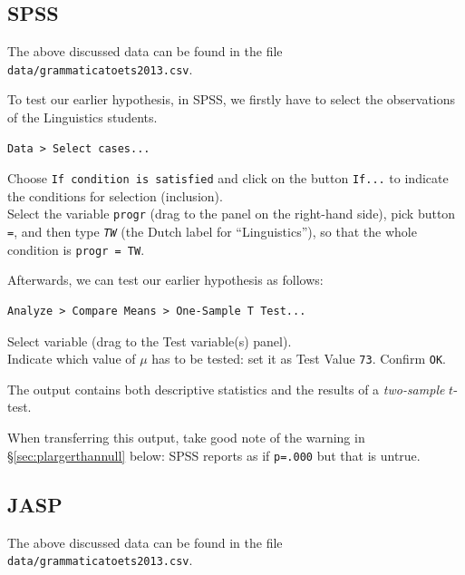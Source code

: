 \documentclass[
]{book}
\begin{document}
\subsection{SPSS}\label{spss-10}

The above discussed data can be found in the file \texttt{data/grammaticatoets2013.csv}.

To test our earlier hypothesis, in SPSS, we firstly have
to select the observations of the Linguistics students.

\begin{verbatim}
Data > Select cases...
\end{verbatim}

Choose \texttt{If\ condition\ is\ satisfied} and click on the button \texttt{If...} to indicate
the conditions for selection (inclusion).~\\
Select the variable \texttt{progr} (drag to the panel on the right-hand side), pick
button \texttt{=}, and then type \emph{\texttt{TW}} (the Dutch label for ``Linguistics''), so that the whole condition is
\texttt{progr\ =\ TW}.

Afterwards, we can test our earlier hypothesis as follows:

\begin{verbatim}
Analyze > Compare Means > One-Sample T Test...
\end{verbatim}

Select variable (drag to the Test variable(s) panel).\\
Indicate which value of \(\mu\) has to be tested: set it as
Test Value \texttt{73}. Confirm \texttt{OK}.

The output contains both descriptive statistics and the results
of a \emph{two-sample} \(t\)-test.

When transferring this output, take good note of the warning in
§\ref{sec:plargerthannull} below: SPSS reports as if \texttt{p=.000} but that is untrue.

\subsection{JASP}\label{sec:jaspttestonesample}

The above discussed data can be found in the file \texttt{data/grammaticatoets2013.csv}.
\end{document}
